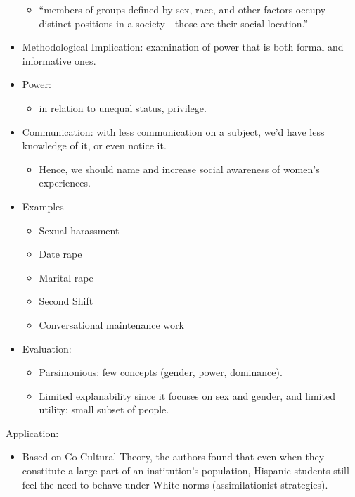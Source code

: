 \documentclass[
]{book}
\providecommand{\tightlist}{%
  \setlength{\itemsep}{0pt}\setlength{\parskip}{0pt}}
\begin{document}
\begin{itemize}
  \begin{itemize}
  \tightlist
  \item
    ``members of groups defined by sex, race, and other factors occupy distinct positions in a society - those are
    their social location.''
  \end{itemize}
\item
  Methodological Implication: examination of power that is both formal and informative ones.
\item
  Power:

  \begin{itemize}
  \tightlist
  \item
    in relation to unequal status, privilege.
  \end{itemize}
\item
  Communication: with less communication on a subject, we'd have less knowledge of it, or even notice it.

  \begin{itemize}
  \tightlist
  \item
    Hence, we should name and increase social awareness of women's experiences.
  \end{itemize}
\item
  Examples

  \begin{itemize}
  \item
    Sexual harassment
  \item
    Date rape
  \item
    Marital rape
  \item
    Second Shift
  \item
    Conversational maintenance work
  \end{itemize}
\item
  Evaluation:

  \begin{itemize}
  \item
    Parsimonious: few concepts (gender, power, dominance).
  \item
    Limited explanability since it focuses on sex and gender, and limited utility: small subset of people.
  \end{itemize}
\end{itemize}

Application:

\citep{Sanford_2019}

\begin{itemize}
\tightlist
\item
  Based on Co-Cultural Theory, the authors found that even when they constitute a large part of an institution's
  population, Hispanic students still feel the need to behave under White norms (assimilationist strategies).
\end{itemize}
\end{document}
